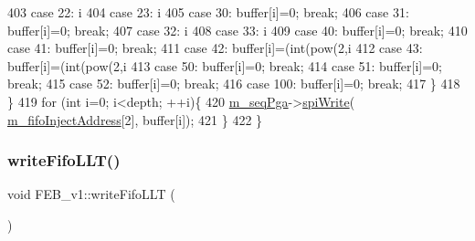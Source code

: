 \begin{DoxyCode}
403     \textcolor{keywordflow}{case} 22:  i%
404     \textcolor{keywordflow}{case} 23:  i%
405     \textcolor{keywordflow}{case} 30:  buffer[i]=0; \textcolor{keywordflow}{break};
406     \textcolor{keywordflow}{case} 31:  buffer[i]=0; \textcolor{keywordflow}{break};
407     \textcolor{keywordflow}{case} 32:  i%
408     \textcolor{keywordflow}{case} 33:  i%
409     \textcolor{keywordflow}{case} 40:  buffer[i]=0; \textcolor{keywordflow}{break};
410     \textcolor{keywordflow}{case} 41:  buffer[i]=0; \textcolor{keywordflow}{break};
411     \textcolor{keywordflow}{case} 42:  buffer[i]=(int(pow(2,i%
412     \textcolor{keywordflow}{case} 43:  buffer[i]=(int(pow(2,i%
413     \textcolor{keywordflow}{case} 50:  buffer[i]=0; \textcolor{keywordflow}{break};
414     \textcolor{keywordflow}{case} 51:  buffer[i]=0; \textcolor{keywordflow}{break};
415     \textcolor{keywordflow}{case} 52:  buffer[i]=0; \textcolor{keywordflow}{break};
416     \textcolor{keywordflow}{case} 100: buffer[i]=0; \textcolor{keywordflow}{break};    
417     \}
418    \}  
419   \textcolor{keywordflow}{for} (\textcolor{keywordtype}{int} i=0; i<depth; ++i)\{
420     \hyperlink{classFEB__v1_a6c7804ac86796f233a8393043adf2e77}{m\_seqPga}->\hyperlink{classSeqPGA_ad4421841ce4ce8b88ad13f63216f0743}{spiWrite}( \hyperlink{classFEB__v1_afd035f292061e1823ed64471bb0228ef}{m\_fifoInjectAddress}[2], buffer[i]);
421   \}
422 \}
\end{DoxyCode}
\mbox{\label{classFEB__v1_a0e88b14453100c97b5962e8a6b0f48bf}} 
\subsubsection{\texorpdfstring{write\+Fifo\+L\+L\+T()}{writeFifoLLT()}}
{\footnotesize\ttfamily void F\+E\+B\+\_\+v1\+::write\+Fifo\+L\+LT (\begin{DoxyParamCaption}{ }\end{DoxyParamCaption})}



